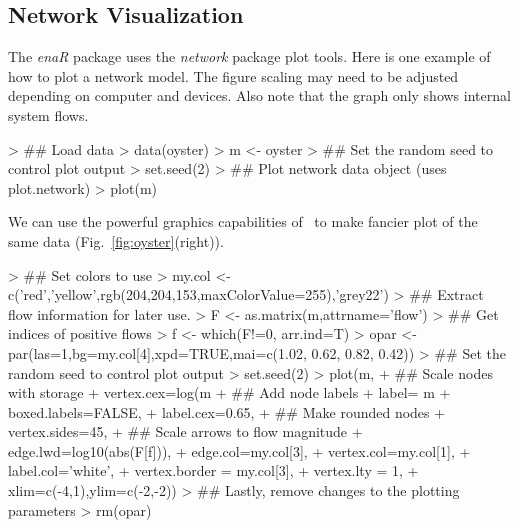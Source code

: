 \documentclass[article]{jss}
\newcommand{\R}{\proglang{R}}
\begin{document}

\subsection{Network Visualization}

The \textit{enaR} package uses the \textit{network} package plot
 tools. Here is
one example of how to plot a network model. The figure scaling may
need to be adjusted depending on computer and devices. Also note that
the graph only shows internal system flows.

\begin{Schunk}
\begin{Sinput}
> ## Load data
> data(oyster)
> m <- oyster
> ## Set the random seed to control plot output
> set.seed(2)
> ## Plot network data object (uses plot.network)
> plot(m)
\end{Sinput}
\end{Schunk}

We can use the powerful graphics capabilities of \R\ to make fancier
plot of the same data (Fig.~\ref{fig:oyster}(right)).


\begin{Schunk}
\begin{Sinput}
> ## Set colors to use
> my.col <- c('red','yellow',rgb(204,204,153,maxColorValue=255),'grey22')
> ## Extract flow information for later use.
> F <- as.matrix(m,attrname='flow')
> ## Get indices of positive flows
> f <- which(F!=0, arr.ind=T)
> opar <- par(las=1,bg=my.col[4],xpd=TRUE,mai=c(1.02, 0.62, 0.82, 0.42))
> ## Set the random seed to control plot output
> set.seed(2)
> plot(m,
+  ## Scale nodes with storage
+       vertex.cex=log(m%
+  ## Add node labels
+       label= m%
+       boxed.labels=FALSE,
+       label.cex=0.65,
+  ## Make rounded nodes
+       vertex.sides=45,
+  ## Scale arrows to flow magnitude
+       edge.lwd=log10(abs(F[f])),
+       edge.col=my.col[3],
+       vertex.col=my.col[1],
+       label.col='white',
+       vertex.border = my.col[3],
+       vertex.lty = 1,
+       xlim=c(-4,1),ylim=c(-2,-2))
> ## Lastly, remove changes to the plotting parameters
> rm(opar)
\end{Sinput}
\end{Schunk}
\end{document}
